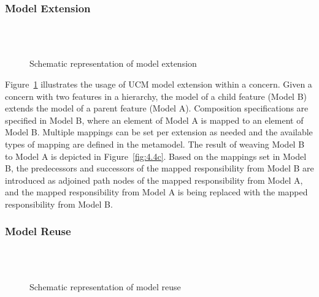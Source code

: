 \subsubsection{Model Extension}

\begin{figure}[h]
	\centering
	 \\
	 \\
	\caption{Schematic representation of model extension}
	\label{fig:4.4}
\end{figure}

Figure~\ref{fig:4.4} illustrates the usage of UCM model extension within a concern. Given a concern with two features in a hierarchy, the model of a child feature (Model B) extends the model of a parent feature (Model A). Composition specifications are specified in Model B, where an element of Model A is mapped to an element of Model B. Multiple mappings can be set per extension as needed and the available types of mapping are defined in the metamodel. The result of weaving Model B to Model A is depicted in Figure~\ref{fig:4.4c}. Based on the mappings set in Model B, the predecessors and successors of the mapped responsibility from Model B are introduced as adjoined path nodes of the mapped responsibility from Model A, and the mapped responsibility from Model A is being replaced with the mapped responsibility from Model B.

\subsubsection{Model Reuse}

\begin{figure}
	\centering
	 \\
	 \\
	\caption{Schematic representation of model reuse}
	\label{fig:4.5}
\end{figure}

